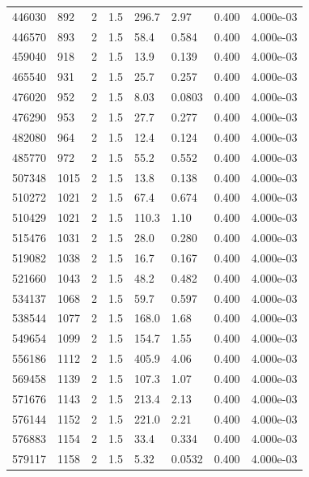 \documentclass[preview]{standalone}
\begin{document}
{{{{{{{{{{{{{{\begin{tabular}{L{1.2cm}C{1.2cm} C{0.3cm}C{0.5cm} C{1.4cm}C{1.4cm} C{1.4cm}C{1.4cm}}
  446030  &   892  & 2     & 1.5 &  296.7  & 2.97  & 0.400 &  4.000e-03   \\ 
  446570  &   893  & 2     & 1.5 &  58.4  & 0.584  & 0.400 &  4.000e-03   \\ 
  459040  &   918  & 2     & 1.5 &  13.9  & 0.139  & 0.400 &  4.000e-03   \\ 
  465540  &   931  & 2     & 1.5 &  25.7  & 0.257  & 0.400 &  4.000e-03   \\ 
  476020  &   952  & 2     & 1.5 &  8.03  & 0.0803  & 0.400 &  4.000e-03   \\ 
  476290  &   953  & 2     & 1.5 &  27.7  & 0.277  & 0.400 &  4.000e-03   \\ 
  482080  &   964  & 2     & 1.5 &  12.4  & 0.124  & 0.400 &  4.000e-03   \\ 
  485770  &   972  & 2     & 1.5 &  55.2  & 0.552  & 0.400 &  4.000e-03   \\ 
  507348  &  1015  & 2     & 1.5 &  13.8  & 0.138  & 0.400 &  4.000e-03   \\ 
  510272  &  1021  & 2     & 1.5 &  67.4  & 0.674  & 0.400 &  4.000e-03   \\ 
  510429  &  1021  & 2     & 1.5 &  110.3  & 1.10  & 0.400 &  4.000e-03   \\ 
  515476  &  1031  & 2     & 1.5 &  28.0  & 0.280  & 0.400 &  4.000e-03   \\ 
  519082  &  1038  & 2     & 1.5 &  16.7  & 0.167  & 0.400 &  4.000e-03   \\ 
  521660  &  1043  & 2     & 1.5 &  48.2  & 0.482  & 0.400 &  4.000e-03   \\ 
  534137  &  1068  & 2     & 1.5 &  59.7  & 0.597  & 0.400 &  4.000e-03   \\ 
  538544  &  1077  & 2     & 1.5 &  168.0  & 1.68  & 0.400 &  4.000e-03   \\ 
  549654  &  1099  & 2     & 1.5 &  154.7  & 1.55  & 0.400 &  4.000e-03   \\ 
  556186  &  1112  & 2     & 1.5 &  405.9  & 4.06  & 0.400 &  4.000e-03   \\ 
  569458  &  1139  & 2     & 1.5 &  107.3  & 1.07  & 0.400 &  4.000e-03   \\ 
  571676  &  1143  & 2     & 1.5 &  213.4  & 2.13  & 0.400 &  4.000e-03   \\ 
  576144  &  1152  & 2     & 1.5 &  221.0  & 2.21  & 0.400 &  4.000e-03   \\ 
  576883  &  1154  & 2     & 1.5 &  33.4  & 0.334  & 0.400 &  4.000e-03   \\ 
  579117  &  1158  & 2     & 1.5 &  5.32  & 0.0532  & 0.400 &  4.000e-03   \\ 

\end{tabular}}}}}}}}}}}}}}}
\end{document}
